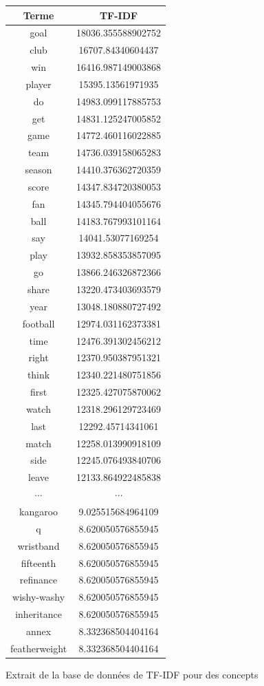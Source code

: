 \documentclass[a4paper, 12pt]{article}
\begin{document}
\begin{figure}[!h]
\begin{center}
 \begin{tabular}{|c|c|}
 \hline
  \textbf{Terme} & \textbf{TF-IDF} \\
  \hline
  goal & 18036.355588902752 \\
  club & 16707.84340604437 \\
  win & 16416.987149003868 \\
  player & 15395.13561971935 \\
  do & 14983.099117885753 \\
  get & 14831.125247005852 \\
  game & 14772.460116022885 \\
  team & 14736.039158065283 \\
  season & 14410.376362720359 \\
  score & 14347.834720380053 \\
  fan & 14345.794404055676 \\
  ball & 14183.767993101164 \\
  say & 14041.53077169254 \\
  play & 13932.858353857095 \\
  go & 13866.246326872366 \\
  share & 13220.473403693579 \\
  year & 13048.180880727492 \\
  football & 12974.031162373381 \\
  time & 12476.391302456212   \\
  right & 12370.950387951321     \\
  think & 12340.221480751856   \\
  first & 12325.427075870062   \\
  watch & 12318.296129723469   \\
  last & 12292.45714341061   \\
  match & 12258.013990918109   \\
  side & 12245.076493840706   \\
  leave & 12133.864922485838   \\
 $\cdots$ & $\cdots$ \\
    kangaroo  & 9.025515684964109  \\
  q  & 8.620050576855945  \\
  wristband  & 8.620050576855945  \\
  fifteenth  & 8.620050576855945  \\
  refinance  & 8.620050576855945  \\
  wishy-washy  & 8.620050576855945  \\
  inheritance  & 8.620050576855945  \\
  annex  & 8.332368504404164  \\
  featherweight  & 8.332368504404164 \\
  \hline
 \end{tabular}
\label{fig:TFIDFConcepts}
\caption{Extrait de la base de données de TF-IDF pour des concepts}
\end{center}
\end{figure}
\end{document}

